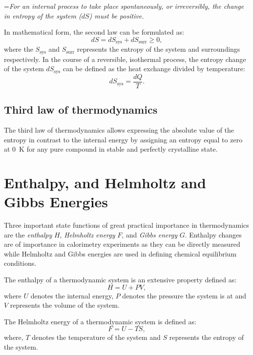 	\hangindent=\parindent \emph{For an internal process to take place spontaneously, or irreversibly, the change in entropy of the system ($dS$) must be positive.}

	\noindent In mathematical form, the second law can be formulated as:
	\begin{equation}\label{eqn:slot}
		dS = dS_\text{sys} + dS_\text{surr} \geq 0,
	\end{equation}
	where the $S_\text{sys}$ and $S_\text{surr}$ represents the entropy of the system and surroundings respectively.
	In the course of a reversible, isothermal process, the entropy change of the system $dS_\text{sys}$   can be defined as the heat exchange divided by temperature:
	\begin{equation}\label{eqn:slotrev}
		dS_\text{sys} = \frac{dQ}{T}.
	\end{equation}

	\subsection{Third law of thermodynamics}
	The third law of thermodynamics allows expressing the absolute value of the entropy in contrast to the internal energy by assigning an entropy equal to zero at \SI{0}{\kelvin} for any pure compound in stable and perfectly crystalline state.

\section{Enthalpy, and Helmholtz and Gibbs Energies}
		Three important state functions of great practical importance in thermodynamics are the \emph{enthalpy} $H$, \emph{Helmholtz energy} $F$, and \emph{Gibbs energy} $G$. Enthalpy changes are of importance in calorimetry experiments as they can be directly measured while Helmholtz and Gibbs energies are used in defining chemical equilibrium conditions.

		The enthalpy of a thermodynamic system is an extensive property defined as:
		\begin{equation}
			H = U + PV,
		\end{equation}
		where $U$ denotes the internal energy, $P$ denotes the pressure the system is at and $V$ represents the volume of the system.

		The Helmholtz energy of a thermodynamic system is defined as:
		\begin{equation}
			F = U - TS,
		\end{equation}
		where, $T$ denotes the temperature of  the system and $S$ represents the entropy of the system.

